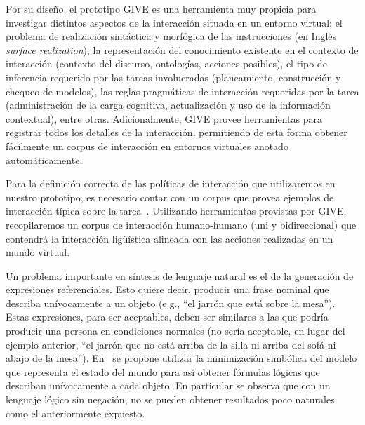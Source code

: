 Por su dise\~no, el prototipo GIVE es una herramienta muy propicia para investigar distintos aspectos de la interacci\'on situada en un entorno virtual:
el problema de realizaci\'on sint\'actica y morf\'ogica de las
instrucciones (en Ingl\'es \emph{surface realization}),
la representaci\'on del conocimiento existente en el contexto de
interacci\'on (contexto del discurso, ontolog\'ias, acciones posibles),
el tipo de inferencia requerido por las tareas involucradas
(planeamiento, construcci\'on y chequeo de modelos),
las reglas pragm\'aticas de interacci\'on requeridas por la tarea
(administraci\'on de la carga cognitiva, actualizaci\'on y uso de la informaci\'on contextual), entre otras. Adicionalmente, GIVE provee herramientas para registrar todos los detalles de la
interacci\'on, permitiendo de esta forma obtener f\'acilmente un corpus de interacci\'on en entornos virtuales anotado autom\'aticamente.

Para la definici\'on correcta de las pol\'iticas de interacci\'on que utilizaremos en nuestro prototipo, es necesario
contar con un corpus que provea ejemplos de interacci\'on t\'ipica sobre la
tarea~\citep{HCRC-93, byron-06}.  Utilizando herramientas provistas por GIVE,
recopilaremos un corpus de interacci\'on humano-humano (uni y bidireccional) que contendr\'a la interacci\'on lig\"u\'istica alineada con las acciones realizadas en un mundo virtual.


Un problema importante en
s\'intesis de lenguaje natural es el de la generaci\'on de expresiones
referenciales. Esto quiere decir, producir una frase nominal que describa
un\'ivocamente a un objeto (e.g., ``el jarr\'on que est\'a sobre la mesa'').
Estas expresiones, para ser aceptables, deben ser similares a las que podr\'ia
producir una persona en condiciones normales (no ser\'ia aceptable, en lugar del
ejemplo anterior, ``el jarr\'on que no est\'a arriba de la silla ni arriba del
sof\'a ni abajo de la mesa'').  En~\citep{AKS08} se propone utilizar la
minimizaci\'on simb\'olica del modelo que representa
el estado del mundo para as\'i obtener f\'ormulas l\'ogicas que describan
un\'ivocamente a cada objeto. En particular se observa que con un
lenguaje l\'ogico sin negaci\'on, no se pueden obtener resultados poco
naturales como el anteriormente expuesto.



